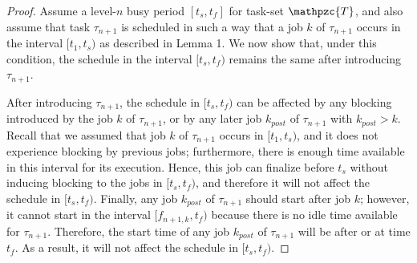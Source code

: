 \documentclass[fleqn]{article}
\begin{document}
%	

\begin{proof}
	Assume a level-$n$ busy period $[t_s,t_f]$ for task-set $\mathpzc{T}$, and also assume that task $\tau_{n+1}$ is scheduled in such a way that a job $k$ of $\tau_{n+1}$ occurs in the interval $[t_1,t_s)$ as described in Lemma 1. We now show that, under this condition, the schedule in the interval $[t_s,t_f)$ remains the same after introducing $\tau_{n+1}$.
	
	After introducing $\tau_{n+1}$, the schedule in $[t_s,t_f)$ can be affected by any blocking introduced by the job $k$ of $\tau_{n+1}$, or by any later job $k_{post}$ of $\tau_{n+1}$ with $k_{post} > k$. Recall that we assumed that job $k$ of $\tau_{n+1}$ occurs in $[t_1,t_s)$, and it does not experience blocking by previous jobs; furthermore, there is enough time available in this interval for its execution. Hence, this job can finalize before $t_s$ without inducing blocking to the jobs in $[t_s,t_f)$, and therefore it will not affect the schedule in $[t_s,t_f)$. Finally, any job $k_{post}$ of $\tau_{n+1}$ should start after job $k$; however, it cannot start in the interval $[f_{n+1,k},t_f)$ because there is no idle time available for $\tau_{n+1}$. Therefore, the start time of any job $k_{post}$ of $\tau_{n+1}$ will be after or at time $t_f$. As a result, it will not affect the schedule in $[t_s,t_f)$.
\end{proof}
\end{document}
